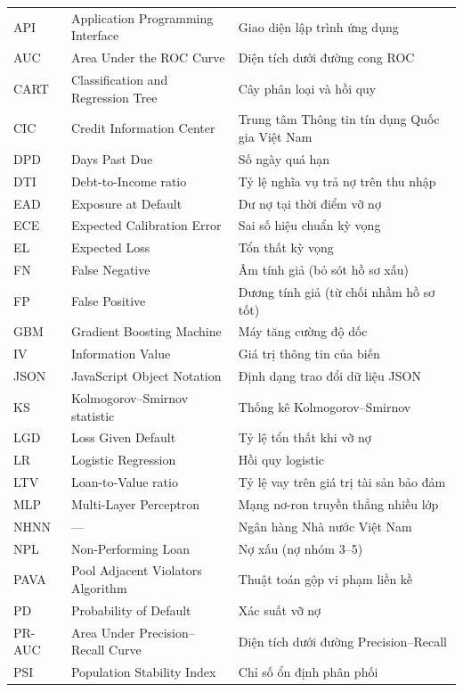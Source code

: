 \begin{longtable}{@{}L{2.2cm}L{5.0cm}L{6.6cm}@{}}
API   & Application Programming Interface & Giao diện lập trình ứng dụng \\
AUC   & Area Under the ROC Curve & Diện tích dưới đường cong ROC \\
CART  & Classification and Regression Tree & Cây phân loại và hồi quy \\
CIC   & Credit Information Center & Trung tâm Thông tin tín dụng Quốc gia Việt Nam \\
DPD   & Days Past Due & Số ngày quá hạn \\
DTI   & Debt-to-Income ratio & Tỷ lệ nghĩa vụ trả nợ trên thu nhập \\
EAD   & Exposure at Default & Dư nợ tại thời điểm vỡ nợ \\
ECE   & Expected Calibration Error & Sai số hiệu chuẩn kỳ vọng \\
EL    & Expected Loss & Tổn thất kỳ vọng \\
FN    & False Negative & Âm tính giả (bỏ sót hồ sơ xấu) \\
FP    & False Positive & Dương tính giả (từ chối nhầm hồ sơ tốt) \\
GBM   & Gradient Boosting Machine & Máy tăng cường độ dốc \\
IV    & Information Value & Giá trị thông tin của biến \\
JSON  & JavaScript Object Notation & Định dạng trao đổi dữ liệu JSON \\
KS    & Kolmogorov--Smirnov statistic & Thống kê Kolmogorov--Smirnov \\
LGD   & Loss Given Default & Tỷ lệ tổn thất khi vỡ nợ \\
LR    & Logistic Regression & Hồi quy logistic \\
LTV   & Loan-to-Value ratio & Tỷ lệ vay trên giá trị tài sản bảo đảm \\
MLP   & Multi-Layer Perceptron & Mạng nơ-ron truyền thẳng nhiều lớp \\
NHNN  & --- & Ngân hàng Nhà nước Việt Nam \\
NPL   & Non-Performing Loan & Nợ xấu (nợ nhóm 3--5) \\
PAVA  & Pool Adjacent Violators Algorithm & Thuật toán gộp vi phạm liền kề \\
PD    & Probability of Default & Xác suất vỡ nợ \\
PR-AUC & Area Under Precision--Recall Curve & Diện tích dưới đường Precision--Recall \\
PSI   & Population Stability Index & Chỉ số ổn định phân phối \\

\end{longtable}
